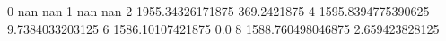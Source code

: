 0 nan nan
1 nan nan
2 1955.34326171875 369.2421875
4 1595.8394775390625 9.7384033203125
6 1586.10107421875 0.0
8 1588.760498046875 2.659423828125
